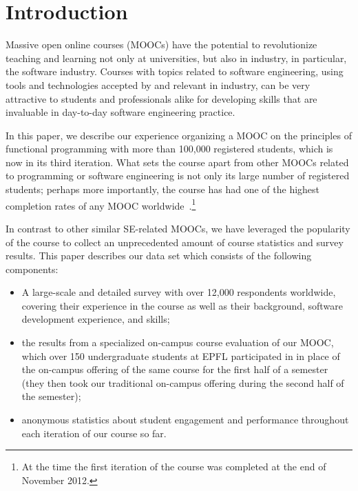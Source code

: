 \documentclass{sig-alternate}
\begin{document}


\section{Introduction}

Massive open online courses (MOOCs) have the potential to revolutionize teaching
and learning not only at
universities, but also in industry, in particular, the software industry.
Courses with topics related to software engineering, using tools and technologies accepted by and relevant in
industry, can be very attractive to students and professionals alike for developing skills
that are invaluable in day-to-day software engineering practice.

In this paper, we describe our experience organizing a MOOC on the principles of functional
programming with more than 100,000 registered students, which is now in its third iteration.
What sets the course apart from other MOOCs related to programming or software engineering is not only its large number of registered students; perhaps more importantly, the course has had one of the highest completion rates of any MOOC worldwide~\cite{Parr13}.\footnote{At the time the first iteration of the course was completed at the end of November 2012.}

In contrast to other similar SE-related MOOCs, we have leveraged the popularity of the course to collect an unprecedented amount of course statistics and survey results. This paper describes our data set which consists of the following components:

\begin{itemize}
\item A large-scale and detailed survey with over 12,000 respondents worldwide, covering their experience in the course as well as their background, software development experience, and skills;
\item the results from a specialized on-campus course evaluation of our MOOC, which over 150 undergraduate students at EPFL participated in in place of the on-campus offering of the same course for the first half of a semester (they then took our traditional on-campus offering during the second half of the semester);
\item anonymous statistics about student engagement and performance throughout each iteration of our course so far.
\end{itemize}
\end{document}
